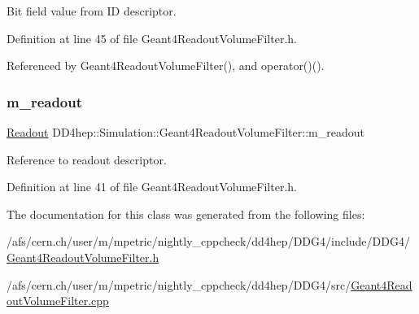 Bit field value from ID descriptor. 



Definition at line 45 of file Geant4\+Readout\+Volume\+Filter.\+h.



Referenced by Geant4\+Readout\+Volume\+Filter(), and operator()().

\hypertarget{class_d_d4hep_1_1_simulation_1_1_geant4_readout_volume_filter_a37eef102fa9c5ac1618be624129b61de}{}\label{class_d_d4hep_1_1_simulation_1_1_geant4_readout_volume_filter_a37eef102fa9c5ac1618be624129b61de} 
\subsubsection{\texorpdfstring{m\+\_\+readout}{m\_readout}}
{\footnotesize\ttfamily \hyperlink{class_d_d4hep_1_1_simulation_1_1_geant4_readout_volume_filter_a30e6a3445a33de61e3c648149e285c46}{Readout} D\+D4hep\+::\+Simulation\+::\+Geant4\+Readout\+Volume\+Filter\+::m\+\_\+readout\hspace{0.3cm}{\ttfamily [protected]}}



Reference to readout descriptor. 



Definition at line 41 of file Geant4\+Readout\+Volume\+Filter.\+h.



The documentation for this class was generated from the following files\+:\begin{DoxyCompactItemize}
\item 
/afs/cern.\+ch/user/m/mpetric/nightly\+\_\+cppcheck/dd4hep/\+D\+D\+G4/include/\+D\+D\+G4/\hyperlink{_geant4_readout_volume_filter_8h}{Geant4\+Readout\+Volume\+Filter.\+h}\item 
/afs/cern.\+ch/user/m/mpetric/nightly\+\_\+cppcheck/dd4hep/\+D\+D\+G4/src/\hyperlink{_geant4_readout_volume_filter_8cpp}{Geant4\+Readout\+Volume\+Filter.\+cpp}\end{DoxyCompactItemize}
